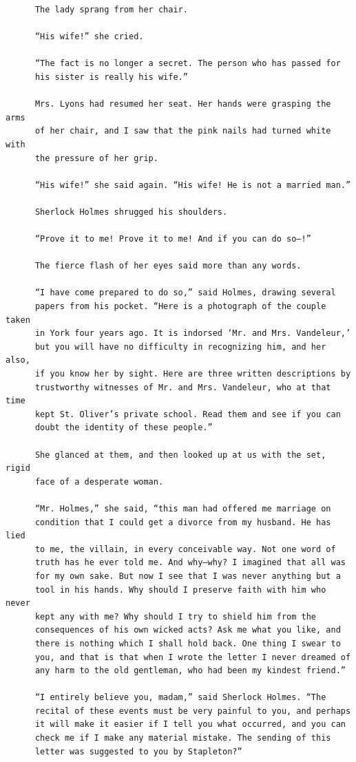 \documentclass{article}
\begin{document}
\begin{verbatim}
      The lady sprang from her chair.

      “His wife!” she cried.

      “The fact is no longer a secret. The person who has passed for
      his sister is really his wife.”

      Mrs. Lyons had resumed her seat. Her hands were grasping the arms
      of her chair, and I saw that the pink nails had turned white with
      the pressure of her grip.

      “His wife!” she said again. “His wife! He is not a married man.”

      Sherlock Holmes shrugged his shoulders.

      “Prove it to me! Prove it to me! And if you can do so—!”

      The fierce flash of her eyes said more than any words.

      “I have come prepared to do so,” said Holmes, drawing several
      papers from his pocket. “Here is a photograph of the couple taken
      in York four years ago. It is indorsed ‘Mr. and Mrs. Vandeleur,’
      but you will have no difficulty in recognizing him, and her also,
      if you know her by sight. Here are three written descriptions by
      trustworthy witnesses of Mr. and Mrs. Vandeleur, who at that time
      kept St. Oliver’s private school. Read them and see if you can
      doubt the identity of these people.”

      She glanced at them, and then looked up at us with the set, rigid
      face of a desperate woman.

      “Mr. Holmes,” she said, “this man had offered me marriage on
      condition that I could get a divorce from my husband. He has lied
      to me, the villain, in every conceivable way. Not one word of
      truth has he ever told me. And why—why? I imagined that all was
      for my own sake. But now I see that I was never anything but a
      tool in his hands. Why should I preserve faith with him who never
      kept any with me? Why should I try to shield him from the
      consequences of his own wicked acts? Ask me what you like, and
      there is nothing which I shall hold back. One thing I swear to
      you, and that is that when I wrote the letter I never dreamed of
      any harm to the old gentleman, who had been my kindest friend.”

      “I entirely believe you, madam,” said Sherlock Holmes. “The
      recital of these events must be very painful to you, and perhaps
      it will make it easier if I tell you what occurred, and you can
      check me if I make any material mistake. The sending of this
      letter was suggested to you by Stapleton?”


\end{verbatim}
\end{document}
